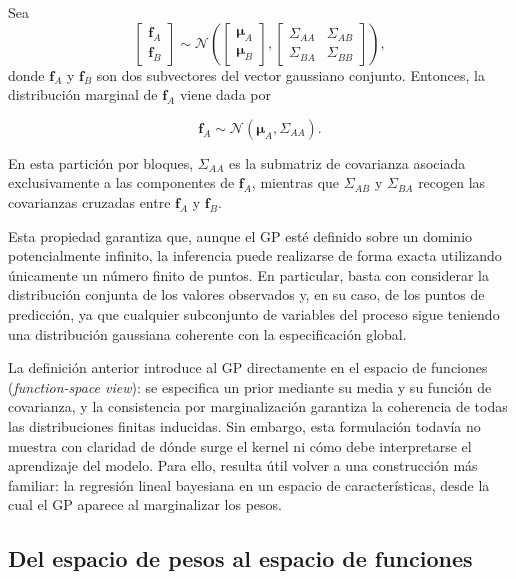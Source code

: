 \begin{proposition}
\label{prop:marginalizacion_gaussiana}

Sea
\[
\begin{bmatrix}
\mathbf{f}_A\\
\mathbf{f}_B
\end{bmatrix}
\sim
\mathcal{N}\!\left(
\begin{bmatrix}
\boldsymbol{\mu}_A\\
\boldsymbol{\mu}_B
\end{bmatrix},
\begin{bmatrix}
\Sigma_{AA} & \Sigma_{AB}\\
\Sigma_{BA} & \Sigma_{BB}
\end{bmatrix}
\right),
\]
donde $\mathbf{f}_A$ y $\mathbf{f}_B$ son dos subvectores del vector gaussiano conjunto.
Entonces, la distribución marginal de $\mathbf{f}_A$ viene dada por

\[
\mathbf{f}_A \sim \mathcal{N}(\boldsymbol{\mu}_A,\Sigma_{AA}).
\]
\end{proposition}
En esta partición por bloques, $\Sigma_{AA}$ es la submatriz de covarianza asociada
exclusivamente a las componentes de $\mathbf{f}_A$, mientras que $\Sigma_{AB}$ y
$\Sigma_{BA}$ recogen las covarianzas cruzadas entre $\mathbf{f}_A$ y $\mathbf{f}_B$.

Esta propiedad garantiza que, aunque el GP esté definido sobre un dominio
potencialmente infinito, la inferencia puede realizarse de forma exacta utilizando únicamente
un número finito de puntos. En particular, basta con considerar la distribución conjunta de
los valores observados y, en su caso, de los puntos de predicción, ya que cualquier
subconjunto de variables del proceso sigue teniendo una distribución gaussiana coherente con
la especificación global.

La definición anterior introduce al GP directamente en el espacio de funciones (\emph{function-space view}): se especifica
un prior mediante su media y su función de covarianza, y la consistencia por marginalización
garantiza la coherencia de todas las distribuciones finitas inducidas. Sin embargo, esta
formulación todavía no muestra con claridad de dónde surge el kernel ni cómo debe
interpretarse el aprendizaje del modelo. Para ello, resulta útil volver a una construcción más
familiar: la regresión lineal bayesiana en un espacio de características, desde la cual el GP
aparece al marginalizar los pesos.

\subsection{Del espacio de pesos al espacio de funciones}

